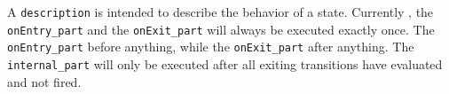 A {\tt description} is intended to describe the behavior
of a state. 
 Currently , the {\tt onEntry\_part} and the
{\tt onExit\_part} will always be executed exactly once.
 The {\tt onEntry\_part}  before anything, while
the {\tt onExit\_part} after anything.
The {\tt internal\_part} will only be executed after all
exiting transitions have evaluated and not fired.